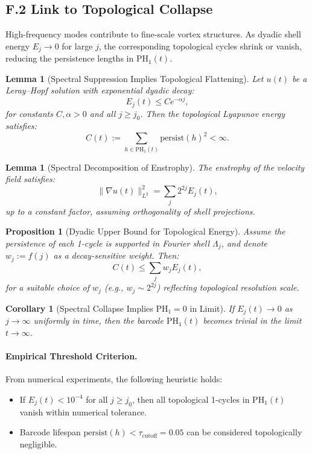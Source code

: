 \documentclass[11pt]{article}
\newtheorem{lemma}[theorem]{Lemma}
\newtheorem{proposition}[theorem]{Proposition}
\newtheorem{corollary}[theorem]{Corollary}
\theoremstyle{definition}
\begin{document}
\subsection*{F.2 Link to Topological Collapse}

High-frequency modes contribute to fine-scale vortex structures. As dyadic shell energy \( E_j \to 0 \) for
large \( j \), the corresponding topological cycles shrink or vanish, reducing the persistence lengths in
\( \mathrm{PH}_1(t) \).

\begin{lemma}[Spectral Suppression Implies Topological Flattening]
Let \( u(t) \) be a Leray--Hopf solution with exponential dyadic decay:
\[ 
E_j(t) \leq C e^{-\alpha j},
\]
for constants \( C, \alpha > 0 \) and all \( j \geq j_0 \). Then the topological Lyapunov energy satisfies:
\[ 
C(t) := \sum_{h \in \mathrm{PH}_1(t)} \text{persist}(h)^2 < \infty.
\]
\end{lemma}

\begin{lemma}[Spectral Decomposition of Enstrophy]
The enstrophy of the velocity field satisfies:
\[ 
\|\nabla u(t)\|_{L^2}^2 = \sum_j 2^{2j} E_j(t),
\]
up to a constant factor, assuming orthogonality of shell projections.
\end{lemma}

\begin{proposition}[Dyadic Upper Bound for Topological Energy]
Assume the persistence of each 1-cycle is supported in Fourier shell \( \Lambda_j \), and denote
\( w_j := f(j) \) as a decay-sensitive weight. Then:
\[ 
C(t) \leq \sum_j w_j E_j(t),
\]
for a suitable choice of \( w_j \) (e.g., \( w_j \sim 2^{2j} \)) reflecting topological resolution scale.
\end{proposition}

\begin{corollary}[Spectral Collapse Implies \( \mathrm{PH}_1 = 0 \) in Limit]
If \( E_j(t) \to 0 \) as \( j \to \infty \) uniformly in time, then the barcode \( \mathrm{PH}_1(t) \) becomes trivial in the limit
\( t \to \infty \).
\end{corollary}

\paragraph{Empirical Threshold Criterion.} From numerical experiments, the following heuristic holds:
\begin{itemize}
  \item If \( E_j(t) < 10^{-4} \) for all \( j \geq j_0 \), then all topological 1-cycles in \( \mathrm{PH}_1(t) \) vanish within numerical tolerance.
  \item Barcode lifespan \( \text{persist}(h) < \tau_{\text{cutoff}} = 0.05 \) can be considered topologically negligible.
\end{itemize}
\end{document}
